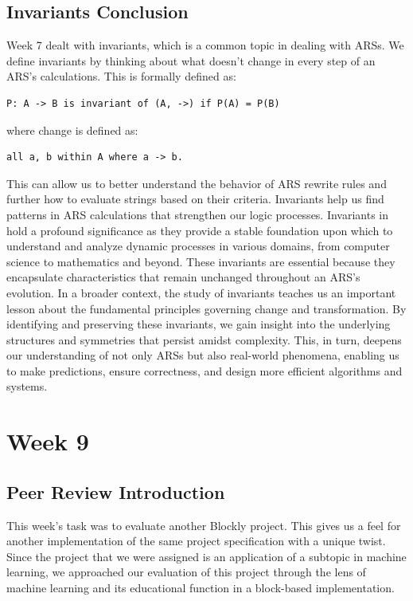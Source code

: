 \documentclass{article}
\theoremstyle{theorem}
\theoremstyle{definition}
\theoremstyle{remark}
\begin{document}
\subsection{Invariants Conclusion}

Week 7 dealt with invariants, which is a common topic in dealing with ARSs. We define invariants by thinking about what doesn't change in every step of an ARS's calculations. This is formally defined as: 
\begin{lstlisting}
P: A -> B is invariant of (A, ->) if P(A) = P(B) 
\end{lstlisting}
where change is defined as: 
\begin{lstlisting}
all a, b within A where a -> b.
\end{lstlisting}
This can allow us to better understand the behavior of ARS rewrite rules and further how to evaluate strings based on their criteria. Invariants help us find patterns in ARS  calculations that strengthen our logic processes. Invariants in hold a profound significance as they provide a stable foundation upon which to understand and analyze dynamic processes in various domains, from computer science to mathematics and beyond. These invariants are essential because they encapsulate characteristics that remain unchanged throughout an ARS's evolution. In a broader context, the study of invariants teaches us an important lesson about the fundamental principles governing change and transformation. By identifying and preserving these invariants, we gain insight into the underlying structures and symmetries that persist amidst complexity. This, in turn, deepens our understanding of not only ARSs but also real-world phenomena, enabling us to make predictions, ensure correctness, and design more efficient algorithms and systems. 

\section{Week 9}

\subsection{Peer Review Introduction}

This week's task was to evaluate another Blockly project. This gives us a feel for another implementation of the same project specification with a unique twist. Since the project that we were assigned is an application of a subtopic in machine learning, we approached our evaluation of this project through the lens of machine learning and its educational function in a block-based implementation.
\end{document}

